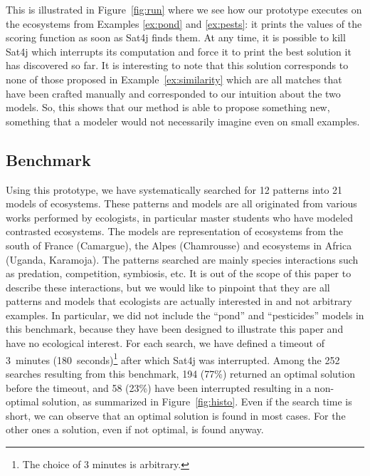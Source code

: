 \documentclass[a4paper,twoside]{article}
\begin{document}
This is illustrated in Figure~\ref{fig:run} where we see how our prototype executes on the ecosystems from Examples \ref{ex:pond} and \ref{ex:pests}: it prints the values of the scoring function as soon as Sat4j finds them. At any time, it is possible to kill Sat4j which interrupts its computation and force it to print the best solution it has discovered so far.
It is interesting to note that this solution corresponds to none of those proposed in Example~\ref{ex:similarity} which are all matches that have been crafted manually and corresponded to our intuition about the two models. So, this shows that our method is able to propose something new, \ie something that a modeler would not necessarily imagine even on small examples.



\subsection{Benchmark}

Using this prototype, we have systematically searched for 12 patterns into 21 models of ecosystems.
These patterns and models are all originated from various works performed by ecologists, in particular master students who have modeled contrasted ecosystems. The models are representation of ecosystems from the south of France (Camargue), the Alpes (Chamrousse) and ecosystems in Africa (Uganda, Karamoja). The patterns searched are mainly species interactions such as predation, competition, symbiosis, etc.
It is out of the scope of this paper to describe these interactions, but we would like to pinpoint that they are all patterns and models that ecologists are actually interested in and not arbitrary examples. 
In particular, we did not include the ``pond'' and ``pesticides'' models in this benchmark, because they have been designed to illustrate this paper and have no ecological interest.
For each search, we have defined a timeout of 3~minutes (180~seconds)\footnote{The choice of 3 minutes is arbitrary.} after which Sat4j was interrupted.
Among the 252 searches resulting from this benchmark, 194 (77\%) returned an optimal solution before the timeout, and 58 (23\%) have been interrupted resulting in a non-optimal solution, as summarized in Figure~\ref{fig:histo}. Even if the search time is short, we can observe that an optimal solution is found in most cases. For the other ones a solution, even if not optimal, is found anyway.
\end{document}
